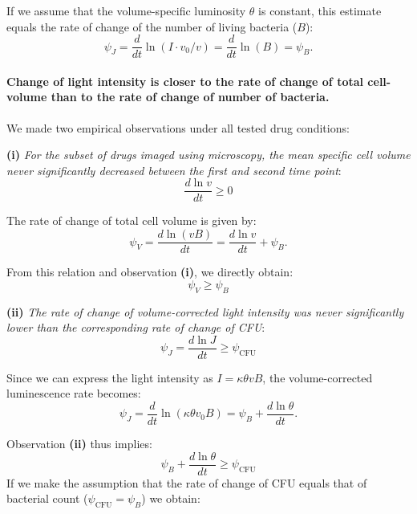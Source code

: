 If we assume that the volume-specific luminosity $\theta$ is constant, this estimate equals the rate of change of the number of living bacteria ($B$):
\begin{equation}
  \psi_J = \frac{d}{dt}\ln(I \cdot v_0/v) = \frac{d}{dt}\ln(B) = \psi_B.
\end{equation}

\paragraph{Change of light intensity is closer to the rate of change of total cell-volume than to the rate of change of number of bacteria.}

We made two empirical observations under all tested drug conditions:

\textbf{(i)} \emph{For the subset of drugs imaged using microscopy, the mean specific cell volume never significantly decreased between the first and second time point}:
\begin{equation}
  \frac{d\ln v}{dt} \geq 0
\end{equation}

The rate of change of total cell volume is given by:
\begin{equation}
  \psi_V =\frac{d\ln(vB)}{dt} =\frac{d\ln v}{dt}+\psi_B. \label{eq:psi_V}
\end{equation}

From this relation and observation \textbf{(i)}, we directly obtain:
\begin{equation}
  \boxed{\psi_V \ge\psi_B} \label{eq:psi_V_B}
\end{equation}

\textbf{(ii)} \emph{The rate of change of volume-corrected light intensity was never significantly lower than the corresponding rate of change of CFU}:
\begin{equation}
  \psi_J=\frac{d\ln J}{dt}\ge\psi_\mathrm{CFU}
  \label{eq:psi_J_ge_B}
\end{equation}

Since we can express the light intensity as $I=\kappa\theta vB$, the volume-corrected luminescence rate becomes:
\begin{equation}
  \psi_J = \frac{d}{dt}\ln(\kappa\theta v_0 B)=\psi_B+\frac{d\ln\theta}{dt}.
\end{equation}

Observation \textbf{(ii)} thus implies:
\begin{equation}
  \psi_B+\frac{d\ln\theta}{dt} \geq \psi_\mathrm{CFU}
\end{equation}
If we make the assumption that the rate of change of CFU equals that of bacterial count ($\psi_\mathrm{CFU}=\psi_B$) we obtain:

